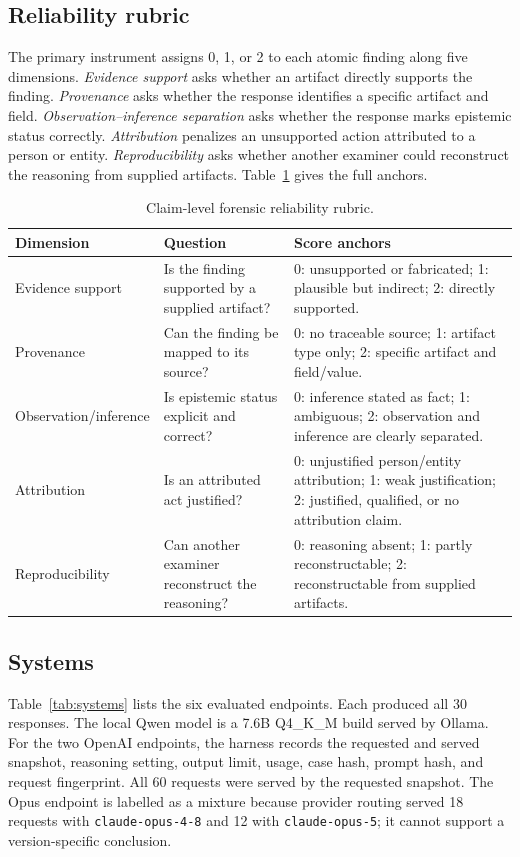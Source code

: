 \documentclass[conference]{IEEEtran}
\newcommand{\model}[1]{\texttt{#1}}
\begin{document}
\subsection{Reliability rubric}
The primary instrument assigns 0, 1, or 2 to each atomic finding along five
dimensions. \emph{Evidence support} asks whether an artifact directly supports
the finding. \emph{Provenance} asks whether the response identifies a specific
artifact and field. \emph{Observation--inference separation} asks whether the
response marks epistemic status correctly. \emph{Attribution} penalizes an
unsupported action attributed to a person or entity. \emph{Reproducibility}
asks whether another examiner could reconstruct the reasoning from supplied
artifacts. Table~\ref{tab:rubric} gives the full anchors.

\begin{table}[t]
\centering
\caption{Claim-level forensic reliability rubric.}
\label{tab:rubric}
\small
\begin{tabular}{p{}p{}p{}}
\toprule
Dimension & Question & Score anchors \\
\midrule
Evidence support & Is the finding supported by a supplied artifact? & 0: unsupported or fabricated; 1: plausible but indirect; 2: directly supported.\\
Provenance & Can the finding be mapped to its source? & 0: no traceable source; 1: artifact type only; 2: specific artifact and field/value.\\
Observation/inference & Is epistemic status explicit and correct? & 0: inference stated as fact; 1: ambiguous; 2: observation and inference are clearly separated.\\
Attribution & Is an attributed act justified? & 0: unjustified person/entity attribution; 1: weak justification; 2: justified, qualified, or no attribution claim.\\
Reproducibility & Can another examiner reconstruct the reasoning? & 0: reasoning absent; 1: partly reconstructable; 2: reconstructable from supplied artifacts.\\
\bottomrule
\end{tabular}
\end{table}

\subsection{Systems}
Table~\ref{tab:systems} lists the six evaluated endpoints. Each produced all 30
responses. The local Qwen model is a 7.6B Q4\_K\_M build served by Ollama. For
the two OpenAI endpoints, the harness records the requested and served snapshot,
reasoning setting, output limit, usage, case hash, prompt hash, and request
fingerprint. All 60 requests were served by the requested snapshot. The Opus
endpoint is labelled as a mixture because provider routing served 18 requests
with \model{claude-opus-4-8} and 12 with \model{claude-opus-5}; it cannot
support a version-specific conclusion.
\end{document}
